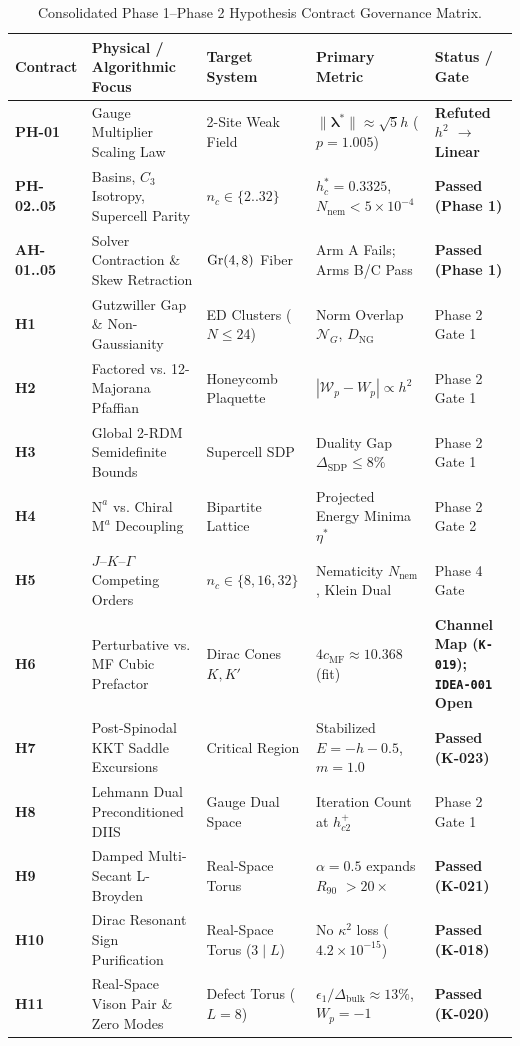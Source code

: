 \begin{table}[htbp]
\centering
\small
\caption{Consolidated Phase 1--Phase 2 Hypothesis Contract Governance Matrix.}
\label{tab:hypothesis_governance_matrix}
\begin{tabular}{lllll}
\toprule
\textbf{Contract} & \textbf{Physical / Algorithmic Focus} & \textbf{Target System} & \textbf{Primary Metric} & \textbf{Status / Gate} \\
\midrule
\textbf{PH-01} & Gauge Multiplier Scaling Law & 2-Site Weak Field & $\|\boldsymbol{\lambda}^*\| \approx \sqrt{5}h$ ($p=1.005$) & \textbf{Refuted $h^2$ $\to$ Linear} \\
\textbf{PH-02..05} & Basins, $C_3$ Isotropy, Supercell Parity & $n_c \in \{2..32\}$ & $h_c^*=0.3325$, $N_{\mathrm{nem}}<5\times 10^{-4}$ & \textbf{Passed (Phase 1)} \\
\textbf{AH-01..05} & Solver Contraction \& Skew Retraction & $\operatorname{Gr}(4, 8)$ Fiber & Arm A Fails; Arms B/C Pass & \textbf{Passed (Phase 1)} \\
\textbf{H1} & Gutzwiller Gap \& Non-Gaussianity & ED Clusters ($N \le 24$) & Norm Overlap $\mathcal{N}_G$, $D_{\mathrm{NG}}$ & Phase 2 Gate 1 \\
\textbf{H2} & Factored vs. 12-Majorana Pfaffian & Honeycomb Plaquette & $|\mathcal{W}_p - W_p| \propto h^2$ & Phase 2 Gate 1 \\
\textbf{H3} & Global 2-RDM Semidefinite Bounds & Supercell SDP & Duality Gap $\Delta_{\mathrm{SDP}} \le 8\%$ & Phase 2 Gate 1 \\
\textbf{H4} & $\mathrm{N}^a$ vs. Chiral $\mathrm{M}^a$ Decoupling & Bipartite Lattice & Projected Energy Minima $\eta^*$ & Phase 2 Gate 2 \\
\textbf{H5} & $J$--$K$--$\Gamma$ Competing Orders & $n_c \in \{8, 16, 32\}$ & Nematicity $N_{\mathrm{nem}}$, Klein Dual & Phase 4 Gate \\
\textbf{H6} & Perturbative vs. MF Cubic Prefactor & Dirac Cones $K, K'$ & $4c_{\mathrm{MF}} \approx 10.368$ (fit) & \textbf{Channel Map (\texttt{K-019}); \texttt{IDEA-001} Open} \\
\textbf{H7} & Post-Spinodal KKT Saddle Excursions & Critical Region & Stabilized $E = -h-0.5$, $m=1.0$ & \textbf{Passed (K-023)} \\
\textbf{H8} & Lehmann Dual Preconditioned DIIS & Gauge Dual Space & Iteration Count at $h_{c2}^+$ & Phase 2 Gate 1 \\
\textbf{H9} & Damped Multi-Secant L-Broyden & Real-Space Torus & $\alpha=0.5$ expands $R_{90}$ $>20\times$ & \textbf{Passed (K-021)} \\
\textbf{H10} & Dirac Resonant Sign Purification & Real-Space Torus ($3 \mid L$) & No $\kappa^2$ loss ($4.2\times 10^{-15}$) & \textbf{Passed (K-018)} \\
\textbf{H11} & Real-Space Vison Pair \& Zero Modes & Defect Torus ($L=8$) & $\epsilon_1 / \Delta_{\mathrm{bulk}} \approx 13\%$, $W_p=-1$ & \textbf{Passed (K-020)} \\
\bottomrule
\end{tabular}
\end{table}

